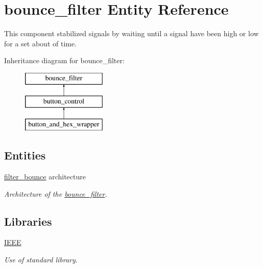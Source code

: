 \hypertarget{classbounce__filter}{\section{bounce\-\_\-filter Entity Reference}
\label{classbounce__filter}
}


This component stabilized signals by waiting until a signal have been high or low for a set about of time.  


Inheritance diagram for bounce\-\_\-filter\-:\begin{figure}[H]
\begin{center}
\leavevmode
\includegraphics[height=3.000000cm]{classbounce__filter}
\end{center}
\end{figure}
\subsection*{Entities}
\begin{DoxyCompactItemize}
\item 
\hyperlink{classbounce__filter_1_1filter__bounce}{filter\-\_\-bounce} architecture
\begin{DoxyCompactList}\small\item\em Architecture of the \hyperlink{classbounce__filter}{bounce\-\_\-filter}. \end{DoxyCompactList}\end{DoxyCompactItemize}
\subsection*{Libraries}
 \begin{DoxyCompactItemize}
\item 
\hypertarget{classbounce__filter_ae4f03c286607f3181e16b9aa12d0c6d4}{\hyperlink{classbounce__filter_ae4f03c286607f3181e16b9aa12d0c6d4}{I\-E\-E\-E} }\label{classbounce__filter_ae4f03c286607f3181e16b9aa12d0c6d4}

\begin{DoxyCompactList}\small\item\em Use of standard library. \end{DoxyCompactList}\end{DoxyCompactItemize}
